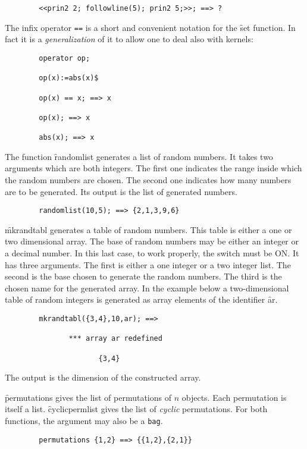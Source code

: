 \begin{itemize}
\begin{verbatim}
        <<prin2 2; followline(5); prin2 5;>>; ==> ?
\end{verbatim}
\hypertarget{reserved:setvalueop}{}
The infix operator \texttt{==} is a short and convenient notation for the \f{set}
function. In fact it is a \emph{generalization} of it to allow one to
deal also with kernels:
\begin{verbatim}
        operator op;

        op(x):=abs(x)$

        op(x) == x; ==> x

        op(x); ==> x
        
        abs(x); ==> x
\end{verbatim}
\hypertarget{operator:RANDOMLIST}{}
The function \f{randomlist} generates a list of random numbers. It takes
two arguments which are both integers. The first one indicates the range
inside which the random numbers are chosen. The second one indicates how
many numbers are to be generated. Its output is the list of 
generated numbers.
\begin{verbatim}
        randomlist(10,5); ==> {2,1,3,9,6}
\end{verbatim}
\hypertarget{operator:MKRANDTABL}{}
\f{mkrandtabl} generates a table of random numbers. This table is either
a one or two dimensional array. The base of random numbers may be either
an integer or a decimal number. In this last case, to work properly,
the switch  must be ON. It has three arguments. The first is
either a one integer or a two integer list. The second is the base chosen
to generate the random numbers. The third is the chosen name for the
generated array. In the example below a two-dimensional table of
random integers is generated as array elements of the identifier {\f ar}.
\begin{verbatim}
        mkrandtabl({3,4},10,ar); ==>

               *** array ar redefined

                      {3,4}
\end{verbatim}
The output is the dimension of the constructed array.

\hypertarget{operator:PERMUTATIONS}{}
\hypertarget{operator:CYCLICPERMLIST}{}
\f{permutations} gives the list of permutations of $n$ objects.
Each permutation is itself a list. \f{cyclicpermlist} gives the list of
\emph{cyclic} permutations. For both functions, the argument may
also be a {\tt bag}.
\begin{verbatim}
        permutations {1,2} ==> {{1,2},{2,1}}


\end{verbatim}
\end{itemize}
